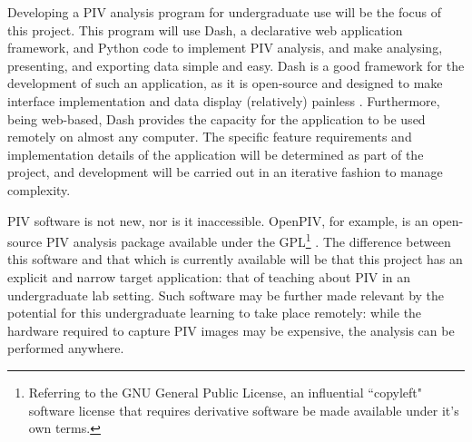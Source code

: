 \documentclass[12pt, a4paper]{amsart}
\begin{document}
Developing a PIV analysis program for undergraduate use will be the focus of this project. This program will use Dash, a declarative web application framework, and Python code to implement PIV analysis, and make analysing, presenting, and exporting data simple and easy. Dash is a good framework for the development of such an application, as it is open-source and designed to make interface implementation and data display (relatively) painless \citep{aboutdash}. Furthermore, being web-based, Dash provides the capacity for the application to be used remotely on almost any computer. The specific feature requirements and implementation details of the application will be determined as part of the project, and development will be carried out in an iterative fashion to manage complexity. 

PIV software is not new, nor is it inaccessible. OpenPIV, for example, is an open-source PIV analysis package available under the GPL\footnote{Referring to the GNU General Public License, an influential ``copyleft" software license that requires derivative software be made available under it's own terms.} \citep{openpiv}. The difference between this software and that which is currently available will be that this project has an explicit and narrow target application: that of teaching about PIV in an undergraduate lab setting. Such software may be further made relevant by the potential for this undergraduate learning to take place remotely: while the hardware required to capture PIV images may be expensive, the analysis can be performed anywhere.
\end{document}
